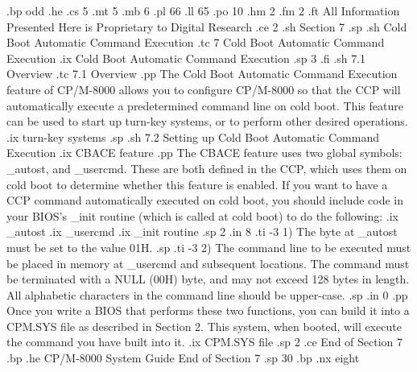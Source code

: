 .bp odd
.he
.cs 5
.mt 5
.mb 6
.pl 66
.ll 65
.po 10
.hm 2
.fm 2
.ft All Information Presented Here is Proprietary to Digital Research
.ce 2
.sh
Section 7
.sp
.sh
Cold Boot Automatic Command Execution
.tc 7  Cold Boot Automatic Command Execution
.ix Cold Boot Automatic Command Execution
.sp 3
.fi
.sh
7.1  Overview
.tc    7.1  Overview
.pp
The Cold Boot Automatic Command Execution feature of CP/M-8000 allows you to 
configure CP/M-8000 so that the CCP will automatically execute a predetermined 
command line on cold boot.  This feature can be used to start up turn-key 
systems, or to perform other desired operations.
.ix turn-key systems
.sp
.sh
7.2  Setting up Cold Boot Automatic Command Execution
.ix CBACE feature
.pp
The CBACE feature uses two global symbols: _autost, and _usercmd.  These are 
both defined in the CCP, which uses them on cold boot
to determine whether this feature is enabled.  If you want to have a CCP
command automatically executed on cold boot, you should include code in your
BIOS's _init routine (which is called at cold boot) to do the following:
.ix _autost
.ix _usercmd
.ix _init routine
.sp 2
.in 8
.ti -3
1) The byte at _autost must be set to the value 01H.
.sp
.ti -3
2) The command line to be executed must be placed in memory at _usercmd and
subsequent locations.  The command must be terminated with a NULL (00H) byte,
and may not exceed 128 bytes in length.  All alphabetic characters in the
command line should be upper-case.
.sp
.in 0
.pp
Once you write a BIOS that performs these two functions, you can 
build it into a CPM.SYS file as described in Section 2.  This system, when
booted, will execute the command you have built into it.
.ix CPM.SYS file
.sp 2
.ce
End of Section 7
.bp
.he CP/M-8000 System Guide                            End of Section 7
.sp 30
.bp
.nx eight
